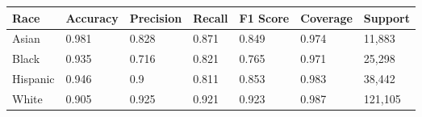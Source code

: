 \begin{tabular}{lllllll}
\toprule
Race & Accuracy & Precision & Recall & F1 Score & Coverage & Support \\
\midrule
Asian & 0.981 & 0.828 & 0.871 & 0.849 & 0.974 & 11,883 \\
Black & 0.935 & 0.716 & 0.821 & 0.765 & 0.971 & 25,298 \\
Hispanic & 0.946 & 0.9 & 0.811 & 0.853 & 0.983 & 38,442 \\
White & 0.905 & 0.925 & 0.921 & 0.923 & 0.987 & 121,105 \\
\bottomrule
\end{tabular}
